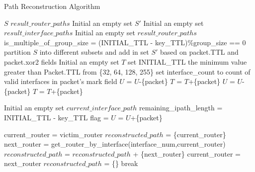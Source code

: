 \begin{algorithm}[htbp]
    \small
    \caption{Path Reconstruction Algorithm}
    \begin{algorithmic}[1] %

        \Require $S$ 
        \Ensure $result\_router\_paths$
        \State Initial an empty set $S'$
        \State Initial an empty set $result\_interface\_paths$
        \State Initial an empty set $result\_router\_paths$
        \State is\_multiple\_of\_group\_size = (INITIAL\_TTL - key\_TTL)\%group\_size == 0
        \State partition $S$ into different subsets and add in set $S'$ based on packet.TTL and packet.xor2 fields 
            \State Initial an empty set $T$ 
            \State  set INITIAL\_TTL the minimum value greater than Packet.TTL from \{32, 64, 128, 255\}
                \State set interface\_count to count of valid interfaces in packet's mark field
                        \State $U$ = $U$-\{packet\}
                        \State  $T$ = $T$+\{packet\}
                    \EndIf
                    \State $U$ = $U$-\{packet\}
                        \State $T$ = $T$+\{packet\}
                    \EndIf
                \EndIf
            \EndFor
        
                \State Initial an empty set $current\_interface\_path$
                \State remaining\_ipath\_length = INITIAL\_TTL - key\_TTL
                \State flag =    
                    \State $U$ = $U$+\{packet\} 
                \EndIf
            \EndFor
        \EndFor
        

            \State current\_router = victim\_router
            \State $reconstructed\_path$ = \{current\_router\}
                    \State next\_router = get\_router\_by\_interface(interface\_num,current\_router)
                    \State $reconstructed\_path$ = $reconstructed\_path$ + \{next\_router\}
                    \State current\_router = next\_router
                \Else
                    \State $reconstructed\_path$ = \{\}
                    \State break
                \EndIf
            \EndFor


\end{algorithmic}
\end{algorithm}
